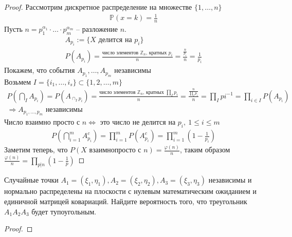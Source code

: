     \begin{proof}
        Рассмотрим дискретное распределение на множестве $\{1, \ldots, n\}$
        \begin{gather*}
            \mathbb{P}(x = k) = \frac{1}{n}
        \end{gather*}
        Пусть $n = p_{1}^{\alpha_{1}} \cdot \ldots \cdot p_{m}^{\alpha_{m}}$ -- разложение $n$.
        \begin{gather*}
            A_{p_{i}} := \{X \text{ делится на } p_{i}\}\\
            P(A_{p_{i}}) = \frac{\text{число элементов $\mathbb{Z}_{n}$, кратных $p_{i}$}}{n}
            = \frac{\frac{n}{p_{i}}}{n}
            = \frac{1}{p_{i}}
        \end{gather*}
        Покажем, что события $A_{p_{1}}, \ldots, A_{p_{m}}$ независимы\\
        Возьмем $I = \{i_{1}, \ldots, i_{s}\} \subset \{1, 2, \ldots, m\}$
        \begin{gather*}
            P(\bigcap\limits_{I} A_{p_{i}})
            = P(A_{\cap_{I} p_{i}})
            = \frac{\text{число элементов } \mathbb{Z}_{n} \text{, кратных } \prod_{I} p_{i}}{n}
            = \frac{\frac{n}{\prod_{I} p_{i}}}{n}
            = \prod_{I} p i^{-1}
            = \prod_{i \in I} P(A_{p_{i}})\\
            \Rightarrow A_{p_{1}, \ldots, p_{m}} \text{ независимы}
        \end{gather*}
        Число взаимно просто с $n \Leftrightarrow$ это число не делится на $p_{i},\ 1 \leqslant i \leqslant m$
        \begin{gather*}
            P(\bigcap\limits_{i = 1}^{m} A_{p_{i}}^{c})
            = \prod\limits_{i = 1}^{m} P (A_{p_{i}}^{c})
            = \prod\limits_{i = 1}^{m} (1 - \frac{1}{p_{i}})
        \end{gather*}
        Заметим теперь, что $P(X \text{ взаимнопросто с } n) = \frac{\varphi (n)}{n}$, таким образом $\frac{\varphi (n)}{n} = \prod\limits_{p|n}(1 - \frac{1}{p})$
    \end{proof}
\vskip 0.6in



    \begin{prob}
        Случайные точки $A_{1}=\left(\xi_{1}, \eta_{1}\right), A_{2}=\left(\xi_{2}, \eta_{2}\right), A_{3}=\left(\xi_{3}, \eta_{3}\right)$ независимы и нормально распределены на плоскости с нулевым математическим ожиданием и единичной матрицей ковариаций. Найдите вероятность того, что треугольник $A_{1} A_{2} A_{3}$ будет тупоугольным.
    \end{prob}
    \begin{proof}
    \end{proof}